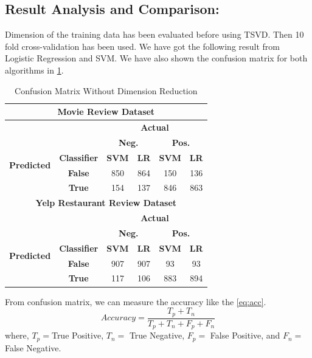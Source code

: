 \documentclass[10pt, conference]{IEEEtran}
\begin{document}
	\subsection{\textbf{Result Analysis and Comparison:}} Dimension of the training data has been evaluated before using TSVD. Then 10 fold cross-validation has been used. We have got the following result from Logistic Regression and SVM. We have also shown the confusion matrix for both algorithms in \ref{table:comp}. 
	
		\begin{table}[H]
		\caption{Confusion Matrix Without Dimension Reduction}
		\begin{center}
			\begin{tabular}{|*{6}{c|}}
			    \hline
			    \multicolumn{6}{|c|}{\textbf{Movie Review Dataset}}\\
				\hline
				\multicolumn{2}{|c|}{\textbf{}} & \multicolumn{4}{|c|}{\textbf{Actual}}\\
				\hline
				\multirow{4}{*}{\begin{sideways}\textbf{Predicted}\end{sideways}} & & \multicolumn{2}{|c|}{\textbf{Neg.}} & \multicolumn{2}{|c|}{\textbf{Pos.}}\\
				\cline{2-6}
				& \textbf{Classifier} & \textbf{SVM} & \textbf{LR} & \textbf{SVM} & \textbf{LR}\\  \cline{2-6}
				& \textbf{False} & 850 & 864 & 150 & 136\\
				\cline{2-6}
				& \textbf{True} & 154 & 137 & 846 & 863\\
				\hline
				\hline
			    \multicolumn{6}{|c|}{\textbf{Yelp Restaurant Review Dataset}}\\
				\hline
				\multicolumn{2}{|c|}{\textbf{}} & \multicolumn{4}{|c|}{\textbf{Actual}}\\
				\hline
				\multirow{4}{*}{\begin{sideways}\textbf{Predicted}\end{sideways}} & & \multicolumn{2}{|c|}{\textbf{Neg.}} & \multicolumn{2}{|c|}{\textbf{Pos.}}\\
				\cline{2-6}
				& \textbf{Classifier} & \textbf{SVM} & \textbf{LR} & \textbf{SVM} & \textbf{LR}\\  \cline{2-6}
				& \textbf{False} & 907 & 907 & 93 & 93\\
				\cline{2-6}
				& \textbf{True} & 117 & 106 & 883 & 894\\
				\hline
			\end{tabular}
			\label{table:comp}
		\end{center}
	\end{table}
	From confusion matrix, we can measure the accuracy like the \eqref{eq:acc}.
	\begin{equation}
	    Accuracy = \dfrac{T_p + T_n}{T_p + T_n + F_p + F_n}
	    \label{eq:acc}
	\end{equation}
	where, $T_p = $True Positive, $T_n = $ True Negative, $F_p = $ False Positive, and $F_n = $ False Negative.
	
\end{document}
